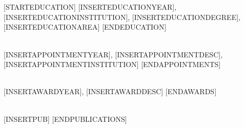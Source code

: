 \NameBoldface{\color{\NameColor}{\NameSize [INSERTNAME] ([INSERTROLE]):}}\\
[INSERTAFFILIATION]

\SectionSpacing
{}\\
[STARTEDUCATION]
[INSERTEDUCATIONYEAR], [INSERTEDUCATIONINSTITUTION], [INSERTEDUCATIONDEGREE], [INSERTEDUCATIONAREA]
[ENDEDUCATION]

\SectionSpacing
{}\\
[STARTAPPOINTMENTS]
[INSERTAPPOINTMENTYEAR], [INSERTAPPOINTMENTDESC], [INSERTAPPOINTMENTINSTITUTION]
[ENDAPPOINTMENTS]

\SectionSpacing
{}\\
[STARTAWARDS]
[INSERTAWARDYEAR], [INSERTAWARDDESC]
[ENDAWARDS]

\SectionSpacing
{}\\
[STARTPUBLICATIONS]
{\PublicationBullet}[INSERTPUB]
[ENDPUBLICATIONS]

